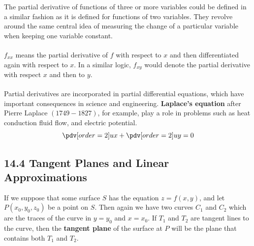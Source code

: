 \documentclass{article}
\begin{document}
	The partial derivative of functions of three or more variables could be defined
	in a similar fashion as it is defined for functions of two variables. They
	revolve around the same central idea of measuring the change of a particular
	variable when keeping one variable constant. \\ \\ $f_{xx}$ means the partial derivative
	of $f$ with respect to $x$ and then differentiated again with respect to $x$.
	In a similar logic, $f_{xy}$ would denote the partial derivative with respect $x$
	and then to $y$. \\ \\ Partial derivatives are incorporated in partial
	differential equations, which have important consequences in science and engineering.
	\textbf{Laplace's equation} after Pierre Laplace $(1749-1827)$, for example, play
	a role in problems such as heat conduction fluid flow, and electric potential.
	\[
		\pdv[order={2}]{u}{x}+ \pdv[order={2}]{u}{y}= 0
	\]

	\subsection{14.4 Tangent Planes and Linear Approximations}
	If we suppose that some surface $S$ has the equation $z=f(x,y)$, and let $P(x_{0}
	,y_{0},z_{0})$ be a point on $S$. Then again we have two curves $C_{1}$ and
	$C_{2}$ which are the traces of the curve in $y=y_{0}$ and $x=x_{0}$. If $T_{1}$
	and $T_{2}$ are tangent lines to the curve, then the \textbf{tangent plane} of
	the surface at $P$ will be the plane that contains both $T_{1}$ and $T_{2}$.\\\\
\end{document}
